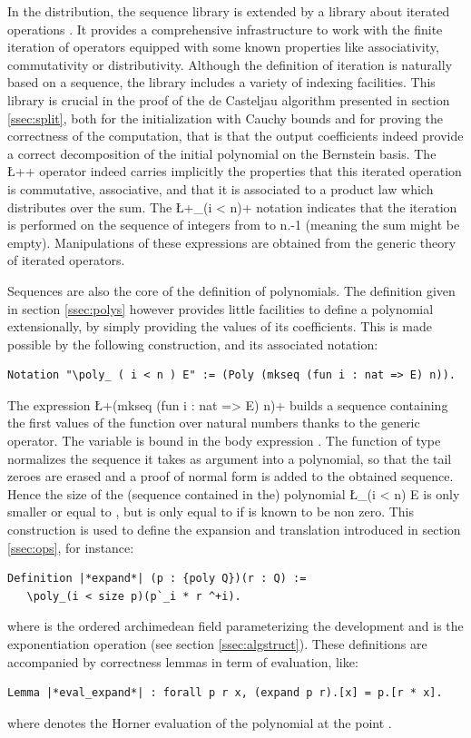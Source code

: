 \documentclass{mscs}
\begin{document}
In the \ssr{} distribution, the sequence library is extended by a
library about iterated operations \cite{BGOBP:BIG08}. It
 provides a comprehensive infrastructure to work with the finite
iteration of operators equipped with some known properties like
associativity, commutativity or distributivity. Although the
definition of iteration is naturally based on a sequence, the library
includes a variety of indexing facilities. This library is
crucial in the proof of the de Casteljau algorithm presented in
section \ref{ssec:split}, both for the initialization with Cauchy
bounds and for proving the correctness of the computation, that is
that the output coefficients indeed provide a correct decomposition of
the initial polynomial on the Bernstein basis. The \L+\sum+ 
operator indeed carries implicitly the properties that this iterated
operation is commutative, associative, and that it is associated to a
product law which distributes over the sum. The \L+\sum_(i < n)+ notation
indicates that the iteration is performed on the sequence of integers
from  to {n.-1} (meaning the sum might be empty).
Manipulations of these expressions are obtained from the generic
theory of iterated operators.

Sequences are also the core of the definition of polynomials. The
definition given in section \ref{ssec:polys} however provides little
facilities to define a polynomial extensionally, by simply providing
the values of its coefficients. This is made possible by the following
construction, and its associated notation:
\begin{lstlisting}
Notation "\poly_ ( i < n ) E" := (Poly (mkseq (fun i : nat => E) n)).
\end{lstlisting}
The expression \L+(mkseq (fun i : nat => E) n)+ builds a sequence 
containing the  first values of the function  over natural
numbers thanks to the generic  operator. The variable 
is bound in the body expression . The  function of type\\
normalizes the sequence it takes as argument into a polynomial, so
that the tail zeroes are erased and a proof of normal form is added to
the obtained sequence. Hence the size of the (sequence contained in
the) polynomial \L{\poly_(i < n) E} is only smaller or equal to ,
but is only equal to  if  is known to be non zero.
This construction is used to define the expansion and translation
introduced in section \ref{ssec:ops}, for instance:
\begin{lstlisting}
Definition |*expand*| (p : {poly Q})(r : Q) := 
   \poly_(i < size p)(p`_i * r ^+i).
\end{lstlisting}
where  is the ordered archimedean field parameterizing the
development and \C{^+} is the exponentiation operation (see section
\ref{ssec:algstruct}). These
definitions are accompanied by correctness lemmas in term of
evaluation, like:
\begin{lstlisting}
Lemma |*eval_expand*| : forall p r x, (expand p r).[x] = p.[r * x].
\end{lstlisting}
where  denotes the Horner evaluation of the polynomial 
at the point .
\end{document}
